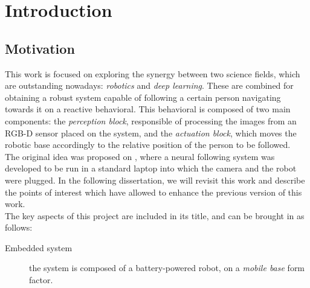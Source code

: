 \chapter{Introduction}
\section{Motivation}
	This work is focused on exploring the synergy between two science fields, which are outstanding nowadays: \textit{robotics} and \textit{deep learning}. These are combined for obtaining a robust system capable of following a certain person navigating towards it on a reactive behavioral. This behavioral is composed of two main components: the \textit{perception block}, responsible of processing the images from an RGB-D sensor placed on the system, and the \textit{actuation block}, which moves the robotic base accordingly to the relative position of the person to be followed.\\
	
	The original idea was proposed on \cite{tfg}, where a neural following system was developed to be run in a standard laptop into which the camera and the robot were plugged. In the following dissertation, we will revisit this work and describe the points of interest which have allowed to enhance the previous version of this work.\\
	
	The key aspects of this project are included in its title, and can be brought in as follows:
	\begin{description}
		\item[Embedded system] the system is composed of a battery-powered robot, on a \textit{mobile base} form factor.
	\end{description}
	
	